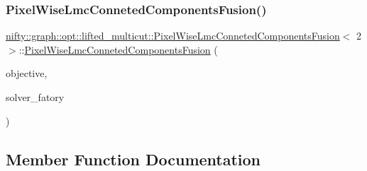\subsubsection{\texorpdfstring{Pixel\+Wise\+Lmc\+Conneted\+Components\+Fusion()}{PixelWiseLmcConnetedComponentsFusion()}\hspace{0.1cm}{\footnotesize\ttfamily [2/2]}}
{\footnotesize\ttfamily \hyperlink{classnifty_1_1graph_1_1opt_1_1lifted__multicut_1_1PixelWiseLmcConnetedComponentsFusion}{nifty\+::graph\+::opt\+::lifted\+\_\+multicut\+::\+Pixel\+Wise\+Lmc\+Conneted\+Components\+Fusion}$<$ 2 $>$\+::\hyperlink{classnifty_1_1graph_1_1opt_1_1lifted__multicut_1_1PixelWiseLmcConnetedComponentsFusion}{Pixel\+Wise\+Lmc\+Conneted\+Components\+Fusion} (\begin{DoxyParamCaption}\item[{const \hyperlink{classnifty_1_1graph_1_1opt_1_1lifted__multicut_1_1PixelWiseLmcObjective}{Pixel\+Wise\+Lmc\+Objective}$<$ \hyperlink{classnifty_1_1graph_1_1opt_1_1lifted__multicut_1_1PixelWiseLmcConnetedComponentsFusion_3_012_01_4_aa53357c01823259e7ac1216f1211a531}{D\+IM} $>$ \&}]{objective,  }\item[{std\+::shared\+\_\+ptr$<$ \hyperlink{classnifty_1_1graph_1_1opt_1_1lifted__multicut_1_1PixelWiseLmcConnetedComponentsFusion_3_012_01_4_ab4ad143cd3473408280088a97d5680c5}{C\+C\+Lmc\+Factory\+Base} $>$}]{solver\+\_\+fatory }\end{DoxyParamCaption})\hspace{0.3cm}{\ttfamily [inline]}}



\subsection{Member Function Documentation}
\mbox{\label{classnifty_1_1graph_1_1opt_1_1lifted__multicut_1_1PixelWiseLmcConnetedComponentsFusion_3_012_01_4_a474eb36f28a8e5053b8779f03524a74e}} 
